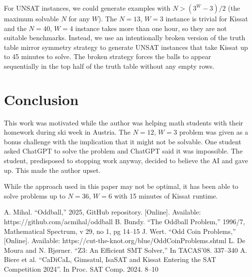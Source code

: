 \documentclass[conference]{IEEEtran}
\begin{document}
For UNSAT instances, we could generate examples with $N > (3^W - 3) / 2$ (the maximum solvable $N$ for any $W$).
The $N=13$, $W=3$ instance is trivial for Kissat and the $N=40$, $W=4$ instance takes more than one hour, so they are not suitable
benchmarks.
Instead, we use an intentionally broken version of the truth table mirror symmetry strategy to generate UNSAT instances that take
Kissat up to 45 minutes to solve.
The broken strategy forces the balls to appear sequentially in the top half of the truth table without any empty rows.

\section{Conclusion}

This work was motivated while the author was helping math students with their homework during ski week in Austria.
The $N=12$, $W=3$ problem was given as a bonus challenge with the implication that it might not be solvable.
One student asked ChatGPT to solve the problem and ChatGPT said it was impossible.
The student, predisposed to stopping work anyway, decided to believe the AI and gave up.
This made the author upset.

While the approach used in this paper may not be optimal, it has been able to solve problems up to $N=36$, $W=6$
with 15 minutes of Kissat runtime.

\begin{thebibliography}{0}
 A. Mihal. ``Oddball,'' 2025, GitHub repository. [Online]. Available: https://github.com/acmihal/oddball
 B. Bundy. ``The Oddball Problem,'' 1996/7, Mathematical Spectrum, v 29, no 1, pg 14--15
 J. Wert. ``Odd Coin Problems,'' [Online]. Available: https://cut-the-knot.org/blue/OddCoinProblems.shtml
 L. De Moura and N. Bj{\o}rner. ``Z3: An Efficient SMT Solver,'' In TACAS'08. 337--340
 A. Biere et al. ``CaDiCaL, Gimsatul, IsaSAT and Kissat Entering the SAT Competition 2024''. In Proc. SAT Comp. 2024. 8--10
\end{thebibliography}
\end{document}
